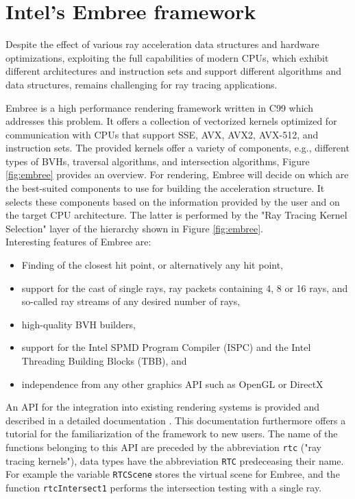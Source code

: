 \section{Intel's Embree framework}
Despite the effect of various ray acceleration data structures and hardware optimizations, exploiting the full capabilities of modern CPUs, which exhibit different architectures and instruction sets and support different algorithms and data structures, remains challenging for ray tracing applications.

Embree is a high performance rendering framework written in C99 which addresses this problem. It offers a collection of vectorized kernels optimized for communication with CPUs that support SSE, AVX, AVX2, AVX-512, and instruction sets. The provided kernels offer a variety of components, e.g., different types of BVHs, traversal algorithms, and intersection algorithms, Figure \ref{fig:embree} provides an overview.
For rendering, Embree will decide on which are the best-suited components to use for building the acceleration structure. It selects these components based on the information provided by the user and on the target CPU architecture. The latter is performed by the "Ray Tracing Kernel Selection" layer of the hierarchy shown in Figure \ref{fig:embree}.
\\

Interesting features of Embree are:
\begin{itemize}
	\setlength\itemsep{0.05em}
	\item 	Finding of the closest hit point, or alternatively any hit point,
	\item 	support for the cast of single rays, ray packets containing 4, 8 or 16 rays, and so-called ray streams of any desired number of rays,
	\item 	high-quality BVH builders,
	\item 	support for the Intel SPMD Program Compiler (ISPC) and the Intel Threading Building Blocks (TBB), and
	\item 	independence from any other graphics API such as OpenGL or DirectX
\end{itemize}

An API for the integration into existing rendering systems is provided and described in a detailed documentation \cite{embree2021Doc}. This documentation furthermore offers a tutorial for the familiarization of the framework to new users. The name of the functions belonging to this API are preceded by the abbreviation \texttt{rtc} ("ray tracing kernels"), data types have the abbreviation \texttt{RTC} predeceasing their name. For example the variable \texttt{RTCScene} stores the virtual scene for Embree, and the function \texttt{rtcIntersect1} performs the intersection testing with a single ray.

